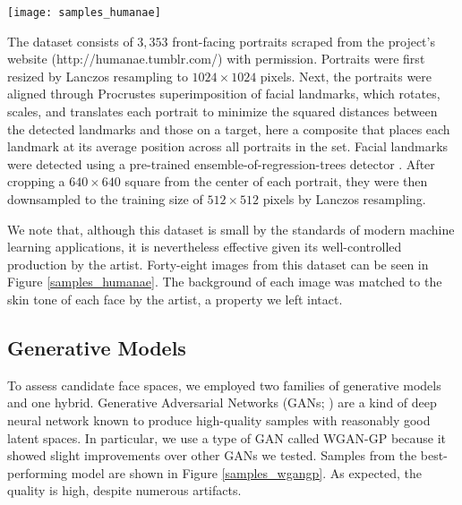 \documentclass[10pt,letterpaper]{article}
\begin{document}
\begin{figure*}[!ht]
  \begin{center}
    \texttt{[image: samples\_humanae]}
  \vspace{-6mm}
  \caption{Sample images from the aligned/cropped Human{\ae} dataset.}
  \label{samples_humanae}
  \end{center}
\end{figure*}

The dataset consists of $3,353$ front-facing portraits scraped from the project's website (http://humanae.tumblr.com/) with permission. Portraits were first resized by Lanczos resampling to $1024\times1024$ pixels. Next, the portraits were aligned through Procrustes superimposition of facial landmarks, which rotates, scales, and translates each portrait to minimize the squared distances between the detected landmarks and those on a target, here a composite that places each landmark at its average position across all portraits in the set. Facial landmarks were detected using a pre-trained ensemble-of-regression-trees detector \citep{kazemi2014one}. After cropping a $640\times640$ square from the center of each portrait, they were then downsampled to the training size of $512\times512$ pixels by Lanczos resampling. 

We note that, although this dataset is small by the standards of modern machine learning applications, it is nevertheless effective given its well-controlled production by the artist. Forty-eight images from this dataset can be seen in Figure \ref{samples_humanae}. The background of each image was matched to the skin tone of each face by the artist, a property we left intact.

\subsection{Generative Models}

To assess candidate face spaces, we employed two families of generative models and one hybrid. Generative Adversarial Networks (GANs; \citealp{goodfellow2014generative}) are a kind of deep neural network known to produce high-quality samples with reasonably good latent spaces. In particular, we use a type of GAN called WGAN-GP \citep{gulrajani2017improved} because it showed slight improvements over other GANs we tested. Samples from the best-performing model are shown in Figure \ref{samples_wgangp}. As expected, the quality is high, despite numerous artifacts. 
\end{document}

